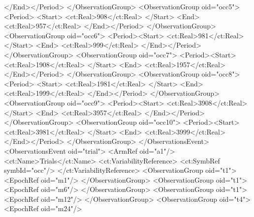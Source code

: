 \documentclass[a4paper,11pt]{article}
\begin{document}
\begin{xmlcode}
                    </End></Period>
                </ObservationGroup>
                <ObservationGroup oid="occ5">
                   <Period> <Start>
                        <ct:Real>908</ct:Real>
                    </Start>
                    <End>
                        <ct:Real>957</ct:Real>
                    </End></Period>
                </ObservationGroup>
                <ObservationGroup oid="occ6">
                    <Period><Start>
                        <ct:Real>981</ct:Real>
                    </Start>
                    <End>
                        <ct:Real>999</ct:Real>
                    </End></Period>
                </ObservationGroup>
                <ObservationGroup oid="occ7">
                    <Period><Start>
                        <ct:Real>1908</ct:Real>
                    </Start>
                    <End>
                        <ct:Real>1957</ct:Real>
                    </End></Period>
                </ObservationGroup>
                <ObservationGroup oid="occ8">
                   <Period> <Start>
                        <ct:Real>1981</ct:Real>
                    </Start>
                    <End>
                        <ct:Real>1999</ct:Real>
                    </End></Period>
                </ObservationGroup>
                <ObservationGroup oid="occ9">
                    <Period><Start>
                        <ct:Real>3908</ct:Real>
                    </Start>
                    <End>
                        <ct:Real>3957</ct:Real>
                    </End></Period>
                </ObservationGroup>
                <ObservationGroup oid="occ10">
                    <Period><Start>
                        <ct:Real>3981</ct:Real>
                    </Start>
                    <End>
                        <ct:Real>3999</ct:Real>
                    </End></Period>
                </ObservationGroup>
            </ObservationsEvent>
            <ObservationsEvent oid="trial">
                <ArmRef oid="a1"/>
                <ct:Name>Trials</ct:Name>
                <ct:VariabilityReference>
                    <ct:SymbRef symbId="occ"/>
                </ct:VariabilityReference>
                <ObservationGroup oid="t1">
                    <EpochRef oid="m1"/>
                </ObservationGroup>
                <ObservationGroup oid="t1">
                    <EpochRef oid="m6"/>
                </ObservationGroup>
                <ObservationGroup oid="t1">
                    <EpochRef oid="m12"/>
                </ObservationGroup>
                <ObservationGroup oid="t4">
                    <EpochRef oid="m24"/>

\end{xmlcode}
\end{document}
